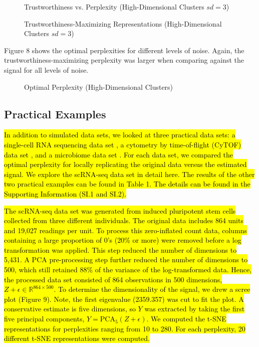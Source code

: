 \documentclass{article}
\begin{document}
\renewcommand{\thefigure}{6}
\begin{figure}[H]
\centering
\caption{Trustworthiness vs. Perplexity (High-Dimensional Clusters $sd = 3$)}
\end{figure}

\renewcommand{\thefigure}{7}
\begin{figure}[H]
\centering
\caption{Trustworthiness-Maximizing Representations (High-Dimensional Clusters $sd = 3$)}
\end{figure}

Figure 8 shows the optimal perplexities for different levels of noise. Again, the trustworthiness-maximizing perplexity was larger when comparing against the signal for all levels of noise.

\renewcommand{\thefigure}{8}
\begin{figure}[H]
\centering
\caption{Optimal Perplexity (High-Dimensional Clusters)}
\end{figure}

\subsection{Practical Examples}
\hl{In addition to simulated data sets, we looked at three practical data sets: a single-cell RNA sequencing data set {\cite{scRNA data}}, a cytometry by time-of-flight (CyTOF) data set {\cite{CyTOF data}}, and a microbiome data set {\cite{enterotype data}}. For each data set, we compared the optimal perplexity for locally replicating the original data versus the estimated signal. We explore the scRNA-seq data set in detail here. The results of the other two practical examples can be found in Table 1. The details can be found in the Supporting Information (SI.1 and SI.2).}

\hl{The scRNA-seq data set was generated from induced pluripotent stem cells collected from three different individuals. The original data includes 864 units and 19,027 readings per unit. To process this zero-inflated count data, columns containing a large proportion of 0's (20\% or more) were removed before a log transformation was applied. This step reduced the number of dimensions to 5,431. A PCA pre-processing step further reduced the number of dimensions to 500, which still retained 88\% of the variance of the log-transformed data. Hence, the processed data set consisted of 864 observations in 500 dimensions, $Z + \epsilon \in \mathbb{R}^{864 \times 500}$. To determine the dimensionality of the signal, we drew a scree plot (Figure 9). Note, the first eigenvalue (2359.357) was cut to fit the plot. A conservative estimate is five dimensions, so $Y$ was extracted by taking the first five principal components, $Y = \textrm{PCA}_5(Z + \epsilon)$. We computed the t-SNE representations for perplexities ranging from 10 to 280. For each perplexity, 20 different t-SNE representations were computed.}
\end{document}
